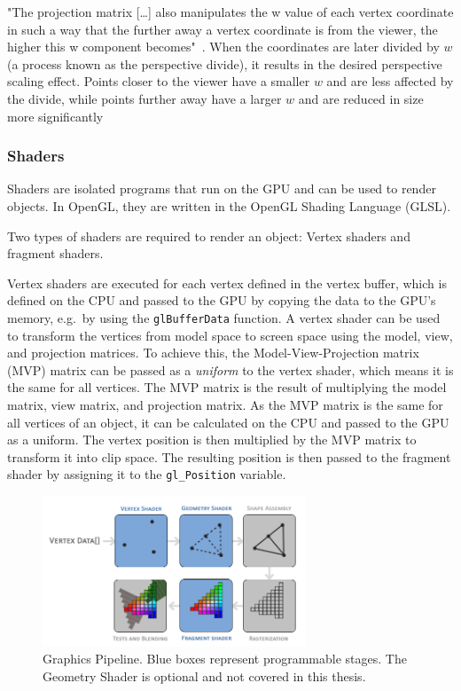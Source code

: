 "The projection matrix [\ldots] also manipulates the w value of each vertex coordinate in such a way
that the further away a vertex coordinate is from the viewer, the higher this w component becomes"~\parencite{de_vries_learn_2020}.
When the coordinates are later divided by $w$ (a process known as the perspective divide), %
it results in the desired perspective scaling effect.
Points closer to the viewer have a smaller $w$ and are less affected by the divide,
while points further away have a larger $w$ and are reduced in size more significantly

\subsubsection{Shaders}\label{subsec:shaders}
Shaders are isolated programs that run on the GPU and can be used to render objects.
In OpenGL, they are written in the OpenGL Shading Language (GLSL).

Two types of shaders are required to render an object: Vertex shaders and fragment shaders.

Vertex shaders are executed for each vertex defined in the vertex buffer, which is defined on the CPU and
passed to the GPU by copying the data to the GPU's memory, e.g.\ by using the \texttt{glBufferData} function.
A vertex shader can be used to transform the vertices from model space to screen space using the
model, view, and projection matrices.
To achieve this, the Model-View-Projection matrix (MVP) matrix can be passed as a \textit{uniform} to the vertex shader,
which means it is the same for all vertices.
The MVP matrix is the result of multiplying the model matrix, view matrix, and projection matrix.
As the MVP matrix is the same for all vertices of an object, it can be calculated on the CPU and passed to the GPU as a uniform.
The vertex position is then multiplied by the MVP matrix to transform it into clip space.
The resulting position is then passed to the fragment shader by assigning it to the \texttt{gl\_Position} variable.

\begin{figure}[h]
    \centering
    \includegraphics[width=0.70\textwidth]{images/graphics-pipeline}
    \caption{Graphics Pipeline. Blue boxes represent programmable stages. The Geometry Shader is optional and not covered in this thesis.}
    \label{fig:graphics-pipeline}
\end{figure}


